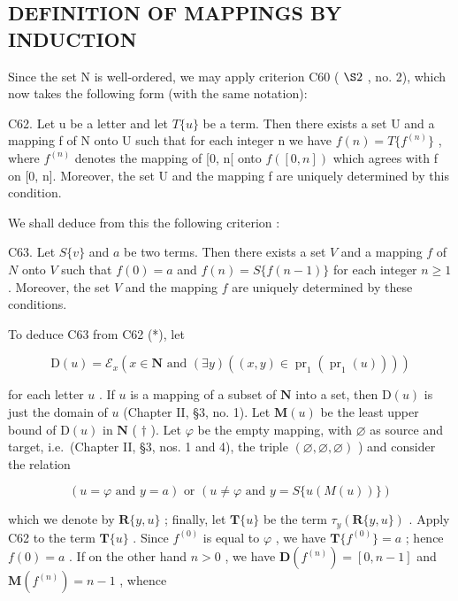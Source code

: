 \subsection{DEFINITION OF MAPPINGS BY INDUCTION}

Since the set N is well-ordered, we may apply criterion C60 ( \(\S2\) , no. 2), which now takes the following form (with the same notation):

C62. Let u be a letter and let \(T\{u\}\) be a term. Then there exists a set U and a mapping f of N onto U such that for each integer n we have \(f(n)=T\{f^{(n)}\}\) , where \(f^{(n)}\) denotes the mapping of {[}0, n{[} onto \(f([0, n])\) which agrees with f on {[}0, n{]}. Moreover, the set U and the mapping f are uniquely determined by this condition.

We shall deduce from this the following criterion :

C63. Let \(S\{v\}\) and \(a\) be two terms. Then there exists a set \(V\) and a mapping \(f\) of \(N\) onto \(V\) such that \(f(0) = a\) and \(f(n) = S\{f(n-1)\}\) for each integer \(n \geqslant 1\) . Moreover, the set \(V\) and the mapping \(f\) are uniquely determined by these conditions.

To deduce C63 from C62 (*), let

\[
\mathrm{D} (u) = \mathcal {E} _ {x} (x \in \mathbf {N} \text {   and   } (\exists y) ((x, y) \in \operatorname{pr} _ {1} (\operatorname{pr} _ {1} (u))))
\]

for each letter \(u\) . If \(u\) is a mapping of a subset of \(\mathbf{N}\) into a set, then \(\mathrm{D}(u)\) is just the domain of \(u\) (Chapter II, §3, no. 1). Let \(\mathbf{M}(u)\) be the least upper bound of \(\mathrm{D}(u)\) in \(\mathbf{N}\) ( \(\dagger\) ). Let \(\varphi\) be the empty mapping, with \(\varnothing\) as source and target, i.e.~(Chapter II, §3, nos. 1 and 4), the triple \((\varnothing, \varnothing, \varnothing)\) ) and consider the relation

\[
(u = \varphi \text {   and   } y = a) \text {   or   } (u \neq \varphi \text {   and   } y = S \{u (M (u)) \})
\]

which we denote by \(\mathbf{R}\{y,u\}\) ; finally, let \(\mathbf{T}\{u\}\) be the term \(\tau_{y}(\mathbf{R}\{y,u\})\) . Apply C62 to the term \(\mathbf{T}\{u\}\) . Since \(f^{(0)}\) is equal to \(\varphi\) , we have \(\mathbf{T}\{f^{(0)}\}=a\) ; hence \(f(0)=a\) . If on the other hand \(n>0\) , we have \(\mathbf{D}(f^{(n)})=[0,n-1]\) and \(\mathbf{M}(f^{(n)})=n-1\) , whence

